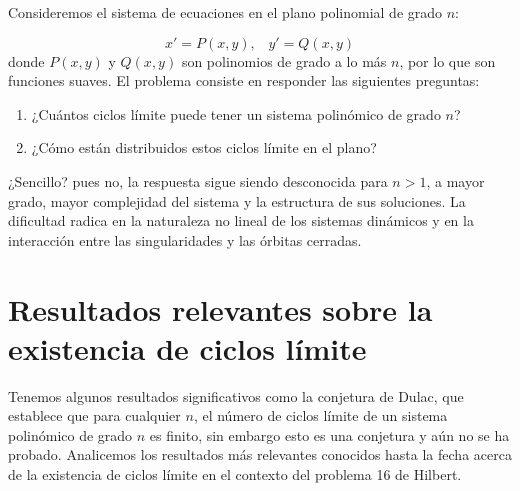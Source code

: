 Consideremos el sistema de ecuaciones en el plano polinomial de grado $n$:

\begin{equation}\label{eq: 16Hilbert}
	x'=P\left(x,y\right)\text{, }\text{  }y'=Q\left(x,y\right)
\end{equation}
donde $P\left(x,y\right)$ y $Q\left(x,y\right)$ son polinomios de grado a lo más $n$, por lo que son funciones suaves. El problema consiste en responder las siguientes preguntas:
\begin{enumerate}
	\item ¿Cuántos ciclos límite puede tener un sistema polinómico de grado $n$?
	\item ¿Cómo están distribuidos estos ciclos límite en el plano?
\end{enumerate}

¿Sencillo? pues no, la respuesta sigue siendo desconocida para $n>1$, a mayor grado, mayor complejidad del sistema y la estructura de sus soluciones. La dificultad radica en la naturaleza no lineal de los sistemas dinámicos y en la interacción entre las singularidades y las órbitas cerradas.

\section{Resultados relevantes sobre la existencia de ciclos límite}

Tenemos algunos resultados significativos como la conjetura de Dulac, que establece que para cualquier $n$, el número de ciclos límite de un sistema polinómico de grado $n$ es finito, sin embargo esto es una conjetura y aún no se ha probado. Analicemos los resultados más relevantes conocidos hasta la fecha acerca de la existencia de ciclos límite en el contexto del problema 16 de Hilbert.

